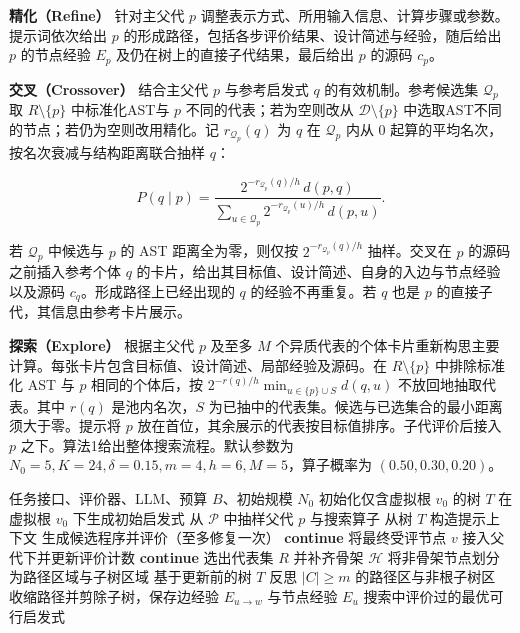 \documentclass{article}
\begin{document}
\textbf{精化（Refine）} 针对主父代 \(p\) 调整表示方式、所用输入信息、计算步骤或参数。提示词依次给出 \(p\) 的形成路径，包括各步评价结果、设计简述与经验，随后给出 \(p\) 的节点经验 \(E_p\) 及仍在树上的直接子代结果，最后给出 \(p\) 的源码 \(c_p\)。

\textbf{交叉（Crossover）} 结合主父代 \(p\) 与参考启发式 \(q\) 的有效机制。参考候选集 \(\mathcal Q_p\) 取 \(R\setminus\{p\}\) 中标准化AST与 \(p\) 不同的代表；若为空则改从 \(\mathcal D\setminus\{p\}\) 中选取AST不同的节点；若仍为空则改用精化。记 \(r_{\mathcal Q_p}(q)\) 为 \(q\) 在 \(\mathcal Q_p\) 内从 \(0\) 起算的平均名次，按名次衰减与结构距离联合抽样 \(q\)：

\[
P(q\mid p) = \frac{2^{-r_{\mathcal Q_p}(q)/h}\,d(p,q)}{\sum_{u\in\mathcal Q_p}2^{-r_{\mathcal Q_p}(u)/h}\,d(p,u)}.
\tag{5}
\]

若 \(\mathcal Q_p\) 中候选与 \(p\) 的 AST 距离全为零，则仅按 \(2^{-r_{\mathcal Q_p}(q)/h}\) 抽样。交叉在 \(p\) 的源码之前插入参考个体 \(q\) 的卡片，给出其目标值、设计简述、自身的入边与节点经验以及源码 \(c_q\)。形成路径上已经出现的 \(q\) 的经验不再重复。若 \(q\) 也是 \(p\) 的直接子代，其信息由参考卡片展示。

\textbf{探索（Explore）} 根据主父代 \(p\) 及至多 \(M\) 个异质代表的个体卡片重新构思主要计算。每张卡片包含目标值、设计简述、局部经验及源码。在 \(R\setminus\{p\}\) 中排除标准化 AST 与 \(p\) 相同的个体后，按 \(2^{-r(q)/h}\min_{u\in\{p\}\cup S}d(q,u)\) 不放回地抽取代表。其中 \(r(q)\) 是池内名次，\(S\) 为已抽中的代表集。候选与已选集合的最小距离须大于零。提示将 \(p\) 放在首位，其余展示的代表按目标值排序。子代评价后接入 \(p\) 之下。算法1给出整体搜索流程。默认参数为 \(N_0=5,K=24,\delta=0.15,m=4,h=6,M=5\)，算子概率为 \((0.50,0.30,0.20)\)。

\begin{algorithm}[H]
\caption{TREES}\label{alg:trees}
\begin{algorithmic}[1]
\REQUIRE 任务接口、评价器、LLM、预算 $B$、初始规模 $N_0$
\STATE 初始化仅含虚拟根 $v_0$ 的树 $T$
    \STATE 在虚拟根 $v_0$ 下生成初始启发式
  \ELSE
    \STATE 从 $\mathcal P$ 中抽样父代 $p$ 与搜索算子
  \ENDIF
  \STATE 从树 $T$ 构造提示上下文
  \STATE 生成候选程序并评价（至多修复一次）
    \STATE \textbf{continue}
  \ENDIF
  \STATE 将最终受评节点 $v$ 接入父代下并更新评价计数
    \STATE \textbf{continue}
  \ENDIF
  \STATE 选出代表集 $R$ 并补齐骨架 $\mathcal H$
  \STATE 将非骨架节点划分为路径区域与子树区域
  \STATE 基于更新前的树 $T$ 反思 $|C|\geq m$ 的路径区与非根子树区
  \STATE 收缩路径并剪除子树，保存边经验 $E_{u\to w}$ 与节点经验 $E_u$
\ENDWHILE
\RETURN 搜索中评价过的最优可行启发式
\end{algorithmic}
\end{algorithm}
\end{document}
